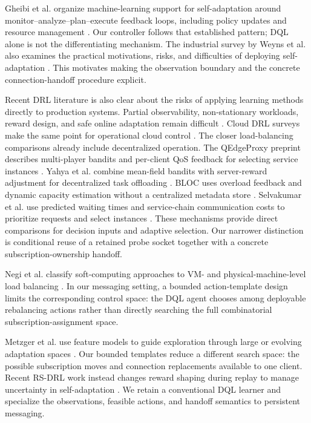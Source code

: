 \documentclass[manuscript]{acmart}
\begin{document}
Gheibi et al. organize machine-learning support for self-adaptation around
monitor--analyze--plan--execute feedback loops, including policy updates and
resource management \cite{Gheibi2021MLSelfAdaptation}. Our controller follows
that established pattern; DQL alone is not the differentiating mechanism.
The industrial survey by Weyns et al. also examines the practical motivations,
risks, and difficulties of deploying self-adaptation
\cite{Weyns2023Industry}. This motivates making the observation boundary and
the concrete connection-handoff procedure explicit.

Recent DRL literature is also clear about the risks of applying learning
methods directly to production systems. Partial observability, non-stationary
workloads, reward design, and safe online adaptation remain difficult
\cite{DulacArnold2021}. Cloud DRL surveys make the same point for operational
cloud control \cite{Zhou2024DRLCloudReview}. The closer load-balancing
comparisons already include decentralized operation. The QEdgeProxy preprint
describes multi-player bandits and per-client QoS feedback for selecting
service instances \cite{Cilic2025}. Yahya et al. combine mean-field bandits
with server-reward adjustment for decentralized task offloading
\cite{Yahya2024}. BLOC uses overload feedback and dynamic capacity estimation
without a centralized metadata store \cite{Bhattacharya2024}. Selvakumar
et al. use predicted waiting times and service-chain communication costs to
prioritize requests and select instances \cite{Selvakumar2023}. These
mechanisms provide direct comparisons for decision inputs and adaptive
selection. Our narrower distinction is conditional reuse of a retained probe
socket together with a concrete subscription-ownership handoff.

Negi et al. classify soft-computing approaches to VM- and physical-machine-level
load balancing \cite{Singh2023SoftCloudLB}. In our messaging setting, a bounded
action-template design limits the corresponding control space: the DQL agent
chooses among deployable rebalancing actions rather than directly searching
the full combinatorial subscription-assignment space.

Metzger et al. use feature models to guide exploration through large or
evolving adaptation spaces \cite{Metzger2024GuidedExploration}. Our bounded
templates reduce a different search space: the possible subscription moves
and connection replacements available to one client. Recent RS-DRL work
instead changes reward shaping during replay to manage uncertainty in
self-adaptation \cite{Kavianifar2026RSDRL}. We retain a conventional DQL
learner and specialize the observations, feasible actions, and handoff
semantics to persistent messaging.
\end{document}
